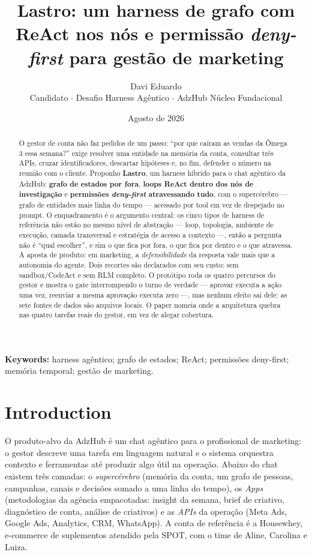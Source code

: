 \documentclass[10pt,twocolumn]{article}
\title{\textbf{Lastro}: um harness de grafo com ReAct nos nós e permissão
\emph{deny-first} para gestão de marketing}
\author{Davi Eduardo\\[2pt]
{\normalsize Candidato $\cdot$ Desafio Harness Agêntico $\cdot$ AdzHub Núcleo Fundacional}}
\date{Agosto de 2026}
\begin{document}
\renewcommand{\abstractname}{Abstract}
\maketitle

\begin{abstract}
\noindent
O gestor de conta não faz pedidos de um passo: ``por que caíram as vendas da Ômega 3 essa
semana?'' exige resolver uma entidade na memória da conta, consultar três APIs, cruzar
identificadores, descartar hipóteses e, no fim, defender o número na reunião com o cliente.
Proponho \textbf{Lastro}, um harness híbrido para o chat agêntico da AdzHub: \textbf{grafo
de estados por fora}, \textbf{loops ReAct dentro dos nós de investigação} e
\textbf{permissões \emph{deny-first} atravessando tudo}, com o supercérebro --- grafo de
entidades mais linha do tempo --- acessado por tool em vez de despejado no prompt. O
enquadramento é o argumento central: os cinco tipos de harness de referência não estão no
mesmo nível de abstração --- loop, topologia, ambiente de execução, camada transversal e
estratégia de acesso a contexto ---, então a pergunta não é ``qual escolher'', e sim o que
fica por fora, o que fica por dentro e o que atravessa. A aposta de produto: em marketing, a
\emph{defensibilidade} da resposta vale mais que a autonomia do agente. Dois recortes são
declarados com seu custo: sem sandbox/CodeAct e sem RLM completo. O protótipo roda os quatro
percursos do gestor e mostra o gate interrompendo o turno de verdade --- aprovar executa a
ação uma vez, reenviar a mesma aprovação executa zero ---, mas nenhum efeito sai dele: as
sete fontes de dados são arquivos locais. O paper nomeia onde a arquitetura quebra nas
quatro tarefas reais do gestor, em vez de alegar cobertura.
\end{abstract}

\smallskip
\noindent\textbf{Keywords:} harness agêntico; grafo de estados; ReAct;
permissões deny-first; memória temporal; gestão de marketing.

\section{Introduction}

O produto-alvo da AdzHub é um chat agêntico para o profissional de marketing: o gestor
descreve uma tarefa em linguagem natural e o sistema orquestra contexto e ferramentas até
produzir algo útil na operação. Abaixo do chat existem três camadas: o \emph{supercérebro}
(memória da conta, um grafo de pessoas, campanhas, canais e decisões somado a uma linha do
tempo), os \emph{Apps} (metodologias da agência empacotadas: insight da semana, brief de
criativo, diagnóstico de conta, análise de criativos) e as \emph{APIs} da operação (Meta
Ads, Google Ads, Analytics, CRM, WhatsApp). A conta de referência é a Housewhey,
e-commerce de suplementos atendido pela SPOT, com o time de Aline, Carolina e Luiza.
\end{document}
